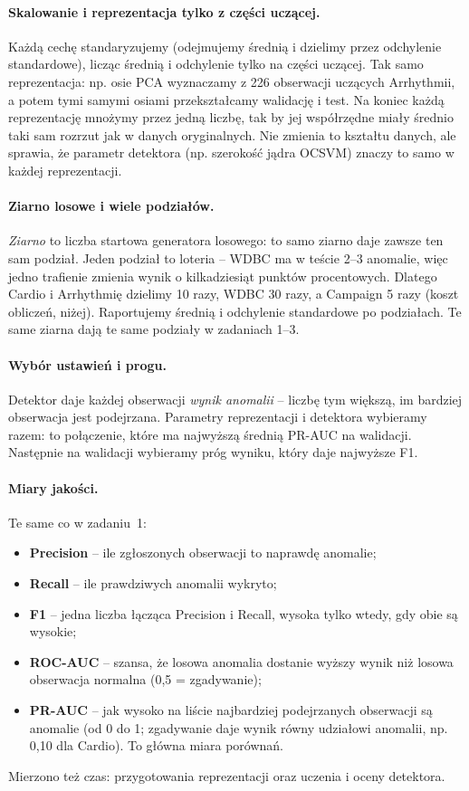 \documentclass[11pt,a4paper]{article}
\begin{document}
\paragraph{Skalowanie i reprezentacja tylko z części uczącej.} Każdą cechę
standaryzujemy (odejmujemy średnią i dzielimy przez odchylenie standardowe),
licząc średnią i odchylenie tylko na części uczącej. Tak samo reprezentacja:
np. osie PCA wyznaczamy z 226 obserwacji uczących Arrhythmii, a potem tymi
samymi osiami przekształcamy walidację i test. Na koniec każdą reprezentację
mnożymy przez jedną liczbę, tak by jej współrzędne miały średnio taki sam
rozrzut jak w danych oryginalnych. Nie zmienia to kształtu danych, ale
sprawia, że parametr detektora (np. szerokość jądra OCSVM) znaczy to samo
w każdej reprezentacji.

\paragraph{Ziarno losowe i wiele podziałów.} \emph{Ziarno} to liczba
startowa generatora losowego: to samo ziarno daje zawsze ten sam podział.
Jeden podział to loteria -- WDBC ma w teście 2--3 anomalie, więc jedno
trafienie zmienia wynik o kilkadziesiąt punktów procentowych. Dlatego Cardio
i Arrhythmię dzielimy 10 razy, WDBC 30 razy, a Campaign 5 razy (koszt
obliczeń, niżej). Raportujemy średnią i odchylenie standardowe po
podziałach. Te same ziarna dają te same podziały w zadaniach 1--3.

\paragraph{Wybór ustawień i progu.} Detektor daje każdej obserwacji
\emph{wynik anomalii} -- liczbę tym większą, im bardziej obserwacja jest
podejrzana. Parametry reprezentacji i detektora wybieramy razem: to
połączenie, które ma najwyższą średnią PR-AUC na walidacji. Następnie na
walidacji wybieramy próg wyniku, który daje najwyższe F1.

\paragraph{Miary jakości.} Te same co w zadaniu~1:
\begin{itemize}
  \item \textbf{Precision} -- ile zgłoszonych obserwacji to naprawdę anomalie;
  \item \textbf{Recall} -- ile prawdziwych anomalii wykryto;
  \item \textbf{F1} -- jedna liczba łącząca Precision i Recall, wysoka tylko
  wtedy, gdy obie są wysokie;
  \item \textbf{ROC-AUC} -- szansa, że losowa anomalia dostanie wyższy wynik
  niż losowa obserwacja normalna (0,5 = zgadywanie);
  \item \textbf{PR-AUC} -- jak wysoko na liście najbardziej podejrzanych
  obserwacji są anomalie (od 0 do 1; zgadywanie daje wynik równy udziałowi
  anomalii, np. 0,10 dla Cardio). To główna miara porównań.
\end{itemize}
Mierzono też czas: przygotowania reprezentacji oraz uczenia i oceny detektora.
\end{document}
